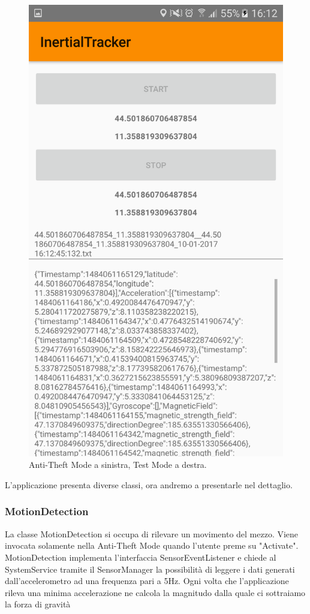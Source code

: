 \documentclass[12pt,a4paper,openright,twoside]{report}
\begin{document}
\begin{figure}[h!]
\includegraphics[scale=0.1]{MainActivity} 
\caption{Anti-Theft Mode a sinistra, Test Mode a destra.} 
\end{figure}

L'applicazione presenta diverse classi, ora andremo a presentarle nel dettaglio.
\subsubsection*{MotionDetection}
La classe MotionDetection si occupa di rilevare un movimento del mezzo. Viene invocata solamente nella Anti-Theft Mode quando l'utente preme su "Activate". \\
MotionDetection implementa l'interfaccia SensorEventListener e chiede al SystemService tramite il SensorManager la possibilità di leggere i dati generati dall'accelerometro ad una frequenza pari a 5Hz.
Ogni volta che l'applicazione rileva una minima accelerazione ne calcola la magnitudo dalla quale ci sottraiamo la forza di gravità
\end{document}

